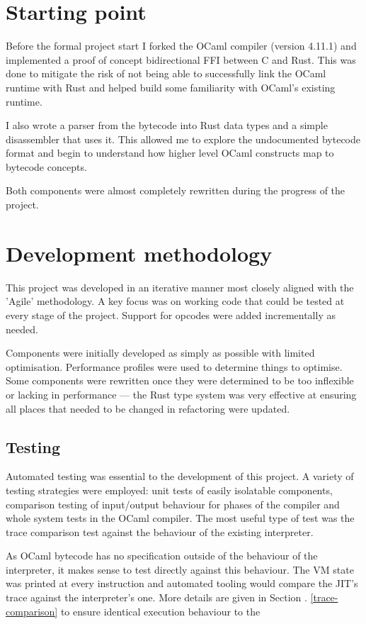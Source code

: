 \section{Starting point}

Before the formal project start I forked the OCaml compiler (version 4.11.1) and implemented a
proof of concept bidirectional FFI between C and Rust. This was done to mitigate the risk of not
being able to successfully link the OCaml runtime with Rust and helped build some familiarity with
OCaml's existing runtime.

I also wrote a parser from the bytecode into Rust data types and a simple disassembler that uses
it. This allowed me to explore the undocumented bytecode format and begin to understand how higher
level OCaml constructs map to bytecode concepts.

Both components were almost completely rewritten during the progress of the project.

\section{Development methodology}

This project was developed in an iterative manner most closely aligned with the 'Agile'
methodology.  A key focus was on working code that could be tested at every stage of the project.
Support for opcodes were added incrementally as needed.

Components were initially developed as simply as possible with limited optimisation. Performance
profiles were used to determine things to optimise. Some components were rewritten once they were
determined to be too inflexible or lacking in performance --- the Rust type system was very
effective
at ensuring all places that needed to be changed in refactoring were updated.

\subsection{Testing}

Automated testing was essential to the development of this project. A variety of testing strategies
were
employed: unit tests of easily isolatable components, comparison testing of input/output behaviour
for phases of the compiler and whole system tests in the OCaml compiler. The most useful type of
test
was the trace comparison test against the behaviour of the existing interpreter.

As OCaml bytecode has no specification outside of the behaviour of the interpreter, it makes sense
to test
directly against this behaviour. The VM state was printed at every instruction and automated
tooling would
compare the JIT's trace against the interpreter's one. More details are given in Section
\label{trace-comparison}.  \ref{trace-comparison} to ensure identical execution behaviour to the

